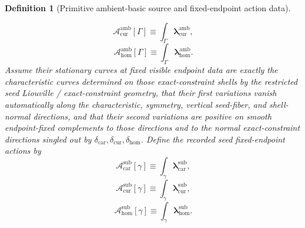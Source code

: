 \documentclass[11pt]{article}
\newcommand{\TensorConstraintGap}{\delta_{\mathrm{car}}}
\newcommand{\CurConstraintGap}{\delta_{\mathrm{cur}}}
\newcommand{\HomConstraintGap}{\delta_{\mathrm{hom}}}
\newcommand{\TensorSeedRateForm}{\boldsymbol{\lambda}_{\mathrm{car}}^{\mathrm{sub}}}
\newcommand{\CurSeedRateForm}{\boldsymbol{\lambda}_{\mathrm{cur}}^{\mathrm{sub}}}
\newcommand{\HomSeedRateForm}{\boldsymbol{\lambda}_{\mathrm{hom}}^{\mathrm{sub}}}
\newcommand{\TensorSeedAction}{\mathscr A_{\mathrm{car}}^{\mathrm{sub}}}
\newcommand{\CurSeedAction}{\mathscr A_{\mathrm{cur}}^{\mathrm{sub}}}
\newcommand{\HomSeedAction}{\mathscr A_{\mathrm{hom}}^{\mathrm{sub}}}
\newcommand{\CurAmbientRateForm}{\boldsymbol{\lambda}_{\mathrm{cur}}^{\mathrm{amb}}}
\newcommand{\HomAmbientRateForm}{\boldsymbol{\lambda}_{\mathrm{hom}}^{\mathrm{amb}}}
\newcommand{\CurAmbientAction}{\mathscr A_{\mathrm{cur}}^{\mathrm{amb}}}
\newcommand{\HomAmbientAction}{\mathscr A_{\mathrm{hom}}^{\mathrm{amb}}}
\newtheorem{definition}{Definition}
\begin{document}
\begin{definition}[Primitive ambient-basic source and fixed-endpoint action data]
\begin{enumerate}
\begin{equation}
    \label{eq:ambient_action_car}
    \end{equation}
    \begin{equation}
    \CurAmbientAction[\Gamma]\equiv\int_\Gamma \CurAmbientRateForm,
    \label{eq:ambient_action_cur}
    \end{equation}
    \begin{equation}
    \HomAmbientAction[\Gamma]\equiv\int_\Gamma \HomAmbientRateForm.
    \label{eq:ambient_action_hom}
    \end{equation}
    Assume their stationary curves at fixed visible endpoint data are exactly the characteristic curves determined on those exact-constraint shells by the restricted seed Liouville / exact-constraint geometry, that their first variations vanish automatically along the characteristic, symmetry, vertical seed-fiber, and shell-normal directions, and that their second variations are positive on smooth endpoint-fixed complements to those directions and to the normal exact-constraint directions singled out by \(\TensorConstraintGap,\CurConstraintGap,\HomConstraintGap\). Define the recorded seed fixed-endpoint actions by
    \begin{equation}
    \TensorSeedAction[\gamma]\equiv\int_\gamma \TensorSeedRateForm,
    \label{eq:seed_action_from_ambient_car}
    \end{equation}
    \begin{equation}
    \CurSeedAction[\gamma]\equiv\int_\gamma \CurSeedRateForm,
    \label{eq:seed_action_from_ambient_cur}
    \end{equation}
    \begin{equation}
    \HomSeedAction[\gamma]\equiv\int_\gamma \HomSeedRateForm.
    \label{eq:seed_action_from_ambient_hom}
    \end{equation}
\end{enumerate}
\end{definition}
\end{document}
